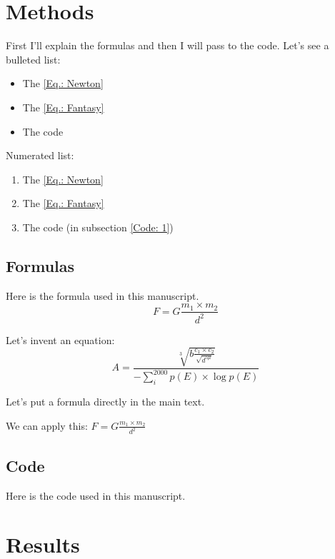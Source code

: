 \documentclass[a4paper, 12pt]{article} %
\begin{document}
\section{Methods}


First I'll explain the formulas and then I will pass to the code.
Let's see a bulleted list: 
\begin{itemize}
    \item The \ref{Eq.: Newton}
    \item The \ref{Eq.: Fantasy}
    \item The code
\end{itemize}
Numerated list:
\begin{enumerate}
    \item The \ref{Eq.: Newton}
    \item The \ref{Eq.: Fantasy}
    \item The code (in subsection \ref{Code: 1})
\end{enumerate}


\subsection{Formulas}
Here is the formula used in this manuscript.
\begin{equation}
    F = G \frac{m_{1} \times m_2}{d^2} %
    \label{Eq.: Newton}
\end{equation}

Let's invent an equation:
\begin{equation}
    A = \frac{\sqrt[3]{b \frac{c_{1} \times c_{2}}{\sqrt{d^{5\mu}}}}}{-\sum_{i}^{2000}{p(E) \times \log{p(E)}}} 
    \label{Eq.: Fantasy}
\end{equation}

\noindent Let's put a formula directly in the main text. 

\noindent We can apply this: $ F = G \frac{m_{1} \times m_2}{d^2} $


\subsection{Code}
Here is the code used in this manuscript.
  


\section{Results}
\end{document}

